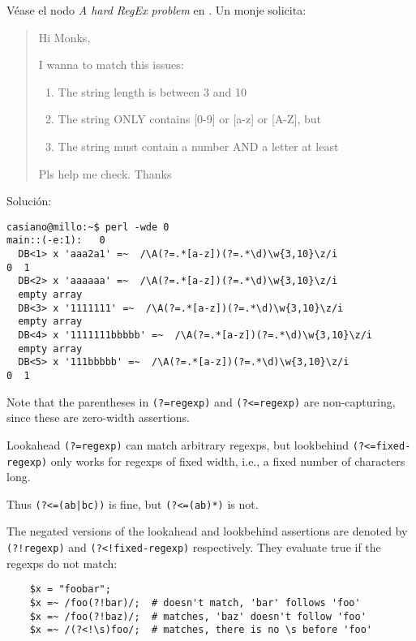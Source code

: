 \begin{it}

Véase el nodo {\it A hard RegEx problem} en . 
Un monje solicita:

\begin{it}
\begin{quotation}
Hi Monks,

I wanna to match this issues:

\begin{enumerate}
   \item The string length is between 3 and 10
   \item The string ONLY contains [0-9] or [a-z] or [A-Z], but
   \item The string must contain a number AND a letter at least 
\end{enumerate}

Pls help me check. Thanks
\end{quotation}
\end{it}

Solución:

\begin{verbatim}
casiano@millo:~$ perl -wde 0
main::(-e:1):   0
  DB<1> x 'aaa2a1' =~  /\A(?=.*[a-z])(?=.*\d)\w{3,10}\z/i
0  1
  DB<2> x 'aaaaaa' =~  /\A(?=.*[a-z])(?=.*\d)\w{3,10}\z/i
  empty array
  DB<3> x '1111111' =~  /\A(?=.*[a-z])(?=.*\d)\w{3,10}\z/i
  empty array
  DB<4> x '1111111bbbbb' =~  /\A(?=.*[a-z])(?=.*\d)\w{3,10}\z/i
  empty array
  DB<5> x '111bbbbb' =~  /\A(?=.*[a-z])(?=.*\d)\w{3,10}\z/i
0  1
\end{verbatim}


Note that the parentheses in \verb|(?=regexp)| and \verb|(?<=regexp)|
are non-capturing, since these are zero-width assertions. 


Lookahead
\verb|(?=regexp)| can match arbitrary regexps, but lookbehind 
\verb|(?<=fixed-regexp)|
only works for regexps of fixed width, i.e., a fixed number of characters
long. 

Thus \verb#(?<=(ab|bc))# is fine, but \verb#(?<=(ab)*)# is not. 


The negated
versions of the lookahead and lookbehind assertions are denoted by
\verb|(?!regexp)| and \verb#(?<!fixed-regexp)# respectively. 
They evaluate true if
the regexps do not match:
\begin{verbatim}
    $x = "foobar";
    $x =~ /foo(?!bar)/;  # doesn't match, 'bar' follows 'foo'
    $x =~ /foo(?!baz)/;  # matches, 'baz' doesn't follow 'foo'
    $x =~ /(?<!\s)foo/;  # matches, there is no \s before 'foo'
\end{verbatim}


\end{it}
